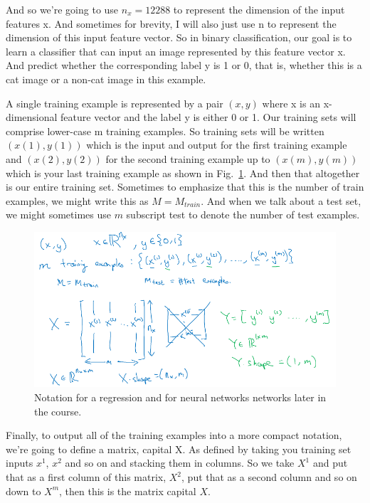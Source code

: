 \documentclass[a4paper]{article}
\begin{document}
And so we're going to use $n_x=12288$ to represent the dimension of the input features x. And sometimes for brevity, I will also just use n to represent the dimension of this input feature vector. So in binary classification, our goal is to learn a classifier that can input an image represented by this feature vector x. And predict whether the corresponding label y is 1 or 0, that is, whether this is a cat image or a non-cat image in this example.

A single training example is represented by a pair $(x,y)$ where x is an x-dimensional feature vector and the label y is either 0 or 1. Our training sets will comprise lower-case m training examples. So training sets will be written $(x(1), y(1))$ which is the input and output for the first training example and $(x(2), y(2))$ for the second training example up to $(x(m), y(m))$ which is your last training example as shown in Fig.~\ref{p2}. And then that altogether is our entire training set. Sometimes to emphasize that this is the number of train examples, we might write this as $M = M_{train}$. And when we talk about a test set, we might sometimes use $m$ subscript test to denote the number of test examples.
\begin{figure}
	\begin{center}
		\includegraphics[scale=0.4]{figures/3.png}
	\end{center}
	\caption{Notation for a regression and for neural networks networks later in the course.}
	\label{p2}
\end{figure}
Finally, to output all of the training examples into a more compact notation, we're going to define a matrix, capital X. As defined by taking you training set inputs $x^1$, $x^2$ and so on and stacking them in columns. So we take $X^1$ and put that as a first column of this matrix, $X^2$, put that as a second column and so on down to $X^m$, then this is the matrix capital $X$.
\end{document}
